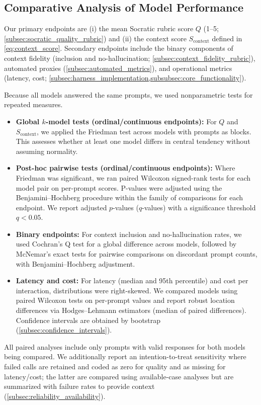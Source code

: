 \subsection{Comparative Analysis of Model Performance}\label{subsec:comparative_analysis}

Our primary endpoints are (i) the mean Socratic rubric score $Q$ (1--5; \cref{subsec:socratic_quality_rubric}) and (ii) the context score $S_{\text{context}}$ defined in \cref{eq:context_score}. Secondary endpoints include the binary components of context fidelity (inclusion and no-hallucination; \cref{subsec:context_fidelity_rubric}), automated proxies (\cref{subsec:automated_metrics}), and operational metrics (latency, cost; \cref{subsec:harness_implementation,subsubsec:core_functionality}).

Because all models answered the same prompts, we used nonparametric tests for repeated measures.

\begin{itemize}
	\item \textbf{Global $k$-model tests (ordinal/continuous endpoints):} For $Q$ and $S_{\text{context}}$, we applied the Friedman test across models with prompts as blocks. This assesses whether at least one model differs in central tendency without assuming normality.
	\item \textbf{Post-hoc pairwise tests (ordinal/continuous endpoints):} Where Friedman was significant, we ran paired Wilcoxon signed-rank tests for each model pair on per-prompt scores. P-values were adjusted using the Benjamini--Hochberg procedure within the family of comparisons for each endpoint. We report adjusted $p$-values ($q$-values) with a significance threshold $q<0.05$.
	\item \textbf{Binary endpoints:} For context inclusion and no-hallucination rates, we used Cochran's Q test for a global difference across models, followed by McNemar's exact tests for pairwise comparisons on discordant prompt counts, with Benjamini--Hochberg adjustment.
	\item \textbf{Latency and cost:} For latency (median and 95th percentile) and cost per interaction, distributions were right-skewed. We compared models using paired Wilcoxon tests on per-prompt values and report robust location differences via Hodges--Lehmann estimators (median of paired differences). Confidence intervals are obtained by bootstrap (\cref{subsec:confidence_intervals}).
\end{itemize}

All paired analyses include only prompts with valid responses for both models being compared. We additionally report an intention-to-treat sensitivity where failed calls are retained and coded as zero for quality and as missing for latency/cost; the latter are compared using available-case analyses but are summarized with failure rates to provide context (\cref{subsec:reliability_availability}).

